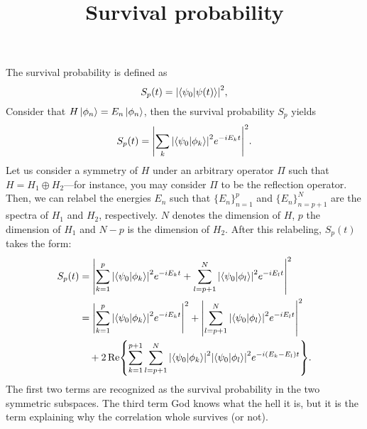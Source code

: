 \documentclass[10pt,a4paper]{article}
\title{Survival probability}
\begin{document}
\maketitle

The survival probability is defined as 
\begin{equation}
S_p(t)
= 
\abs{\braket{\psi_0}{\psi(t)}}^2,
\end{equation}
Consider that $H \ket{\phi_n} = E_n \ket{\phi_n}$, then the survival probability
$S_p$ yields
\begin{equation}
S_p(t) 
= 
\abs{
\sum_{k}
\abs{\braket{\psi_0}{\phi_k}}^2
e^{-i E_k t}
}^2.
\end{equation}
Let us consider a symmetry of $H$ under an arbitrary operator $\Pi$ such 
that $H = H_1 \oplus H_2$---for instance, you may consider $\Pi$ to be the 
reflection operator. Then, we can relabel the energies $E_n$ such that 
$\{E_n\}_{n=1}^p$ and $\{E_n\}_{n=p+1}^N$ are the spectra of $H_1$ and 
$H_2$, respectively. $N$ denotes the dimension of $H$, $p$ the dimension of 
$H_1$ and $N-p$ is the dimension of $H_2$. After this relabeling, $S_p(t)$
takes the form:
\begin{align}
S_p(t) 
&=
\abs{
\sum_{k = 1}^p
\abs{\braket{\psi_0}{\phi_k}}^2
e^{-i E_k t}
+
\sum_{l = p+1}^N
\abs{\braket{\psi_0}{\phi_l}}^2
e^{-i E_l t}
}^2 \\
%
&= 
\abs{
\sum_{k = 1}^p
\abs{\braket{\psi_0}{\phi_k}}^2
e^{-i E_k t}
}^2 
+
\abs{
\sum_{l = p+1}^N
\abs{\braket{\psi_0}{\phi_l}}^2
e^{-i E_l t}
}^2 \\
&\quad +
2\Re{
\sum_{k=1}^{p+1}\sum_{l = p+1}^N
\abs{\braket{\psi_0}{\phi_k}}^2
\abs{\braket{\psi_0}{\phi_l}}^2
e^{-i(E_k - E_l) t}
}.
\end{align}
The first two terms are recognized as the survival probability in the two
symmetric subspaces. The third term God knows what the hell it is, but it 
is the term explaining why the correlation whole survives (or not).

\end{document}
